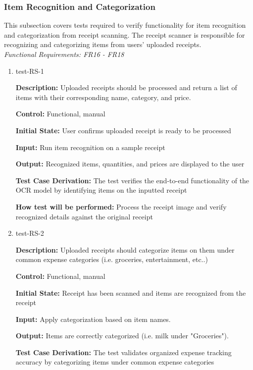 \documentclass[12pt, titlepage]{article}
\begin{document}
\subsubsection{Item Recognition and Categorization}

This subsection covers tests required to verify functionality for item recognition and categorization from receipt scanning. The receipt scanner is responsible for recognizing and categorizing items from users' uploaded receipts.\\
\textit{Functional Requirements: FR16 - FR18}

\begin{enumerate}
\item{test-RS-1\\}

\textbf{Description:} Uploaded receipts should be processed and return a list of
items with their corresponding name, category, and price.

\textbf{Control:} Functional, manual

\textbf{Initial State:} User confirms uploaded receipt is ready to be processed

\textbf{Input:} Run item recognition on a sample receipt

\textbf{Output:} Recognized items, quantities, and prices are displayed to the
user

\textbf{Test Case Derivation:} The test verifies the end-to-end functionality  of the OCR model
by identifying items on the inputted receipt

\textbf{How test will be performed:} Process the receipt image and verify
recognized details against the original receipt

\item{test-RS-2\\}

\textbf{Description:} Uploaded receipts should categorize items on them under common expense categories (i.e. groceries, entertainment, etc..)

\textbf{Control:} Functional, manual

\textbf{Initial State:} Receipt has been scanned and items are recognized from the receipt

\textbf{Input:} Apply categorization based on item names.

\textbf{Output:} Items are correctly categorized (i.e. milk under "Groceries").

\textbf{Test Case Derivation:} The test validates organized expense tracking accuracy by categorizing items under common expense categories


\end{enumerate}
\end{document}
